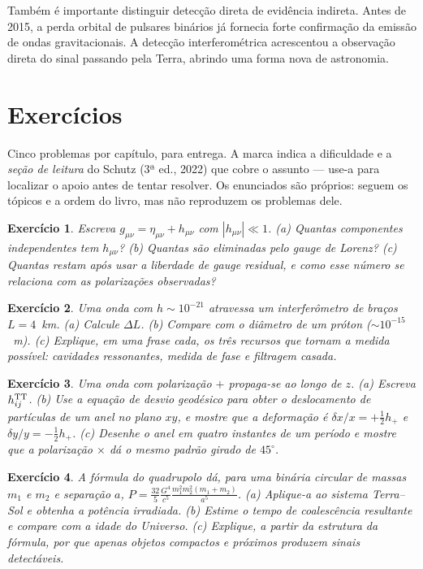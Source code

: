 \documentclass[12pt,a4paper,oneside]{book}
\theoremstyle{rgplain}
\newtheorem{exercise}{Exercício}[chapter]
\theoremstyle{rgremark}
\begin{document}
Também é importante distinguir detecção direta de evidência indireta. Antes de
2015, a perda orbital de pulsares binários já fornecia forte confirmação da
emissão de ondas gravitacionais. A detecção interferométrica acrescentou a
observação direta do sinal passando pela Terra, abrindo uma forma nova de
astronomia.

\clearpage


\clearpage
\section{Exercícios}
\begin{leitura}
Cinco problemas por capítulo, para entrega. A marca indica a dificuldade e a \emph{seção de leitura} do Schutz (3ª ed., 2022) que cobre o assunto --- use-a para localizar o apoio antes de tentar resolver. Os enunciados são próprios: seguem os tópicos e a ordem do livro, mas não reproduzem os problemas dele.
\end{leitura}

\begin{exercise}
Escreva $g_{\mu\nu}=\eta_{\mu\nu}+h_{\mu\nu}$ com $|h_{\mu\nu}|\ll1$.
(a) Quantas componentes independentes tem $h_{\mu\nu}$? (b) Quantas são
eliminadas pelo gauge de Lorenz? (c) Quantas restam após usar a liberdade de
gauge residual, e como esse número se relaciona com as polarizações
observadas?
\end{exercise}

\begin{exercise}
Uma onda com $h\sim10^{-21}$ atravessa um interferômetro de braços
$L=4$~km. (a) Calcule $\Delta L$. (b) Compare com o diâmetro de um próton
($\sim10^{-15}$~m). (c) Explique, em uma frase cada, os três recursos que
tornam a medida possível: cavidades ressonantes, medida de fase e filtragem
casada.
\end{exercise}

\begin{exercise}
Uma onda com polarização $+$ propaga-se ao longo de $z$. (a) Escreva
$h^{\rm TT}_{ij}$. (b) Use a equação de desvio geodésico para obter o
deslocamento de partículas de um anel no plano $xy$, e mostre que a
deformação é $\delta x/x=+\tfrac12 h_+$ e $\delta y/y=-\tfrac12 h_+$.
(c) Desenhe o anel em quatro instantes de um período e mostre que a
polarização $\times$ dá o mesmo padrão girado de $45^\circ$.
\end{exercise}

\begin{exercise}
A fórmula do quadrupolo dá, para uma binária circular de massas $m_1$ e
$m_2$ e separação $a$,
$P=\frac{32}{5}\frac{G^4}{c^5}\frac{m_1^2m_2^2(m_1+m_2)}{a^5}$.
(a) Aplique-a ao sistema Terra--Sol e obtenha a potência irradiada.
(b) Estime o tempo de coalescência resultante e compare com a idade do
Universo. (c) Explique, a partir da estrutura da fórmula, por que apenas
objetos compactos e próximos produzem sinais detectáveis.
\end{exercise}
\end{document}
